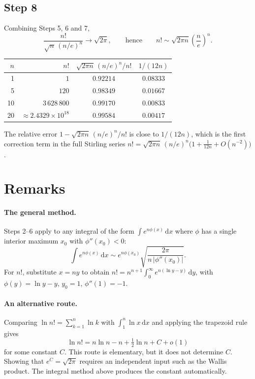 \documentclass{workbook}
\theoremstyle{step}
\newcommand{\dd}{\,\mathrm{d}}
\begin{document}
\subsection*{Step 8}

Combining Steps 5, 6 and 7,
\[
  \frac{n!}{\sqrt{n}\,(n/e)^n} \longrightarrow \sqrt{2\pi},
  \qquad\text{hence}\qquad
  n! \sim \sqrt{2\pi n}\left(\frac{n}{e}\right)^{n}.
\]

\begin{center}
\begin{tabular}{rrcc}
  \toprule
  $n$ & $n!$ & $\sqrt{2\pi n}\,(n/e)^n / n!$ & $1/(12n)$ \\
  \midrule
   1 & $1$                    & $0.92214$ & $0.08333$ \\
   5 & $120$                  & $0.98349$ & $0.01667$ \\
  10 & $3\,628\,800$          & $0.99170$ & $0.00833$ \\
  20 & $\approx 2.4329\times 10^{18}$ & $0.99584$ & $0.00417$ \\
  \bottomrule
\end{tabular}
\end{center}

\noindent The relative error $1 - \sqrt{2\pi n}\,(n/e)^n/n!$ is close to
$1/(12n)$, which is the first correction term in the full Stirling series
$n! = \sqrt{2\pi n}\,(n/e)^n\bigl(1 + \tfrac{1}{12n} + O(n^{-2})\bigr)$.

\section{Remarks}

\paragraph{The general method.} Steps 2--6 apply to any integral of the form
$\int e^{n\phi(x)}\dd x$ where $\phi$ has a single interior maximum $x_0$
with $\phi''(x_0) < 0$:
\[
  \int e^{n\phi(x)}\dd x \sim e^{n\phi(x_0)}\sqrt{\frac{2\pi}{n\,|\phi''(x_0)|}} .
\]
For $n!$, substitute $x = n y$ to obtain
$n! = n^{n+1}\int_0^\infty e^{n(\ln y - y)}\dd y$, with $\phi(y) = \ln y - y$,
$y_0 = 1$, $\phi''(1) = -1$.

\paragraph{An alternative route.} Comparing
$\ln n! = \sum_{k=1}^{n}\ln k$ with $\int_1^n \ln x\dd x$ and applying the
trapezoid rule gives
\[
  \ln n! = n\ln n - n + \tfrac{1}{2}\ln n + C + o(1)
\]
for some constant $C$. This route is elementary, but it does not determine
$C$. Showing that $e^{C} = \sqrt{2\pi}$ requires an independent input such as
the Wallis product. The integral method above produces the constant
automatically.
\end{document}
